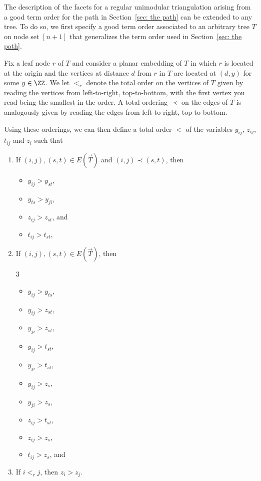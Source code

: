 The description of the facets for a regular unimodular triangulation arising from a good term order for the path in Section~\ref{sec: the path} can be extended to any tree.  
To do so, we first specify a good term order associated to an arbitrary tree $T$ on node set $[n+1]$ that generalizes the term order used in Section~\ref{sec: the path}.  

Fix a leaf node $r$ of $T$ and consider a planar embedding of $T$ in which $r$ is located at the origin and the vertices at distance $d$ from $r$ in $T$ are located at $(d, y)$ for some $y\in \ZZ$. 
We let $<_r$ denote the total order on the vertices of $T$ given by reading the vertices from left-to-right, top-to-bottom, with the first vertex you read being the smallest in the order. 
A total ordering $\prec$ on the edges of $T$ is analogously given by reading the edges from left-to-right, top-to-bottom. 

Using these orderings, we can then define a total order $<$ of the variables $y_{ij}$, $z_{ij}$, $t_{ij}$ and $z_i$ such that
\begin{enumerate}
    \item If $(i,j),(s,t)\in E(\overrightarrow{T})$ and $(i,j)\prec (s,t)$, then
    \begin{itemize}
        \item $y_{ij} > y_{st}$,
        \item $y_{ts} > y_{ji}$, 
        \item $z_{ij} > z_{st}$, and
        \item $t_{ij} > t_{st}$, 
    \end{itemize}
    \item If $(i,j), (s,t)\in E(\overrightarrow{T})$, then 
    \vspace{-12pt}
    \begin{multicols}{3}
    \begin{itemize}
        \item $y_{ij} > y_{ts}$,
        \item $y_{ij} > z_{st}$, 
        \item $y_{ji} > z_{st}$, 
        \item $y_{ij} > t_{st}$, 
        \item $y_{ji} > t_{st}$,
        \item $y_{ij} > z_s$, 
        \item $y_{ji} > z_s$, 
        \item $z_{ij} > t_{st}$, 
        \item $z_{ij} > z_s$,
        \item $t_{ij} > z_s$, and
    \end{itemize}
    \end{multicols}
    \vspace{-12pt}
    \item If $i <_r j$, then $z_i > z_j$. 
\end{enumerate}

